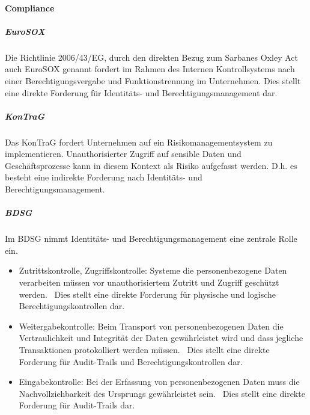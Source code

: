 \documentclass[12pt]{article}
\begin{document}
\paragraph{Compliance}
\subparagraph{EuroSOX}
Die Richtlinie 2006/43/EG, durch den direkten Bezug zum Sarbanes Oxley Act auch EuroSOX genannt fordert im Rahmen des Internen Kontrollsystems nach einer Berechtigungsvergabe und Funktionstrennung im Unternehmen. Dies stellt eine direkte Forderung für Identitäts- und Berechtigungsmanagement dar.~\cite{conta2017leitfaden}
\subparagraph{KonTraG}
Das KonTraG fordert Unternehmen auf ein Risikomanagementsystem zu implementieren. Unauthorisierter Zugriff auf sensible Daten und Geschäftsprozesse kann in diesem Kontext als Risiko aufgefasst werden. D.h. es besteht eine indirekte Forderung nach Identitäts- und Berechtigungsmanagement.~\cite{conta2017leitfaden}
\subparagraph{BDSG}
Im BDSG nimmt Identitäts- und Berechtigungsmanagement eine zentrale Rolle ein.
\begin{itemize}
  \item Zutrittskontrolle, Zugriffskontrolle: Systeme die personenbezogene Daten verarbeiten müssen vor unauthorisiertem Zutritt und Zugriff geschützt werden.~\cite{conta2017leitfaden} Dies stellt eine direkte Forderung für physische und logische Berechtigungskontrollen dar.
  \item Weitergabekontrolle: Beim Transport von personenbezogenen Daten die Vertraulichkeit und Integrität der Daten gewährleistet wird und dass jegliche Transaktionen protokolliert werden müssen.~\cite{conta2017leitfaden} Dies stellt eine direkte Forderung für Audit-Trails und Berechtigungskontrollen dar.
  \item Eingabekontrolle: Bei der Erfassung von personenbezogenen Daten muss die Nachvollziehbarkeit des Ursprungs gewährleistet sein.~\cite{conta2017leitfaden} Dies stellt eine direkte Forderung für Audit-Trails dar.
\end{itemize}
\end{document}
